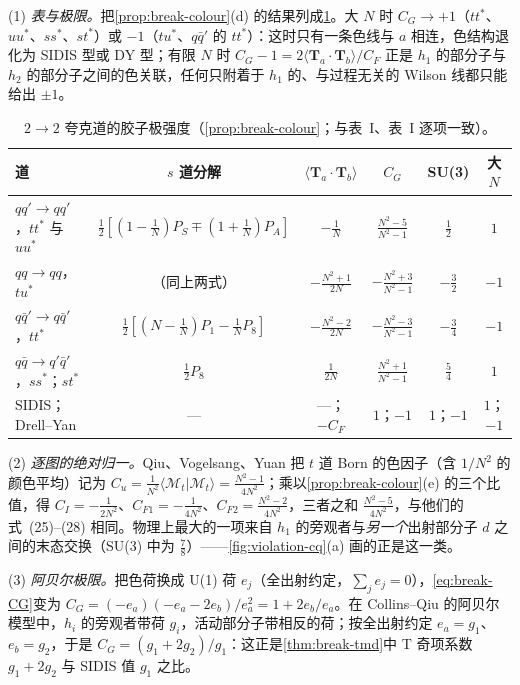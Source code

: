 \begin{example}\label{ex:break-colour}
(1) \emph{表与极限。}把\cref{prop:break-colour}(d) 的结果列成\cref{tab:break-CG}。大 $N$ 时 $C_G\to+1$（$tt^*$、$uu^*$、$ss^*$、$st^*$）或 $-1$（$tu^*$、$q\bar q'$ 的 $tt^*$）：这时只有一条色线与 $a$ 相连，色结构退化为 SIDIS 型或 DY 型；有限 $N$ 时 $C_G-1=2\langle\mathbf T_a\cdot\mathbf T_b\rangle/C_F$ 正是 $h_1$ 的部分子与 $h_2$ 的部分子之间的色关联，任何只附着于 $h_1$ 的、与过程无关的 Wilson 线都只能给出 $\pm1$。

\begin{table}[htbp]
\centering
\caption{$2\to2$ 夸克道的胶子极强度（\cref{prop:break-colour}；与\cite{BacchettaBomhofMuldersPijlman2005}表~I、\cite{QiuVogelsangYuan2007}表~I 逐项一致）。}
\label{tab:break-CG}
\small
\begin{tabular}{@{}lccccc@{}}
\toprule
道 & $s$ 道分解 & $\langle\mathbf T_a\cdot\mathbf T_b\rangle$ & $C_G$ & SU(3) & 大 $N$ \\
\midrule
$qq'\to qq'$，$tt^*$ 与 $uu^*$ & $\frac12[(1-\frac1N)P_S\mp(1+\frac1N)P_A]$ & $-\frac1N$ & $\frac{N^2-5}{N^2-1}$ & $\frac12$ & $1$ \\
$qq\to qq$，$tu^*$ & （同上两式） & $-\frac{N^2+1}{2N}$ & $-\frac{N^2+3}{N^2-1}$ & $-\frac32$ & $-1$ \\
$q\bar q'\to q\bar q'$，$tt^*$ & $\frac12[(N-\frac1N)P_1-\frac1NP_8]$ & $-\frac{N^2-2}{2N}$ & $-\frac{N^2-3}{N^2-1}$ & $-\frac34$ & $-1$ \\
$q\bar q\to q'\bar q'$，$ss^*$；$st^*$ & $\frac12P_8$ & $\frac1{2N}$ & $\frac{N^2+1}{N^2-1}$ & $\frac54$ & $1$ \\
\midrule
SIDIS；Drell--Yan & — & —；$-C_F$ & $1$；$-1$ & $1$；$-1$ & $1$；$-1$ \\
\bottomrule
\end{tabular}
\end{table}

(2) \emph{逐图的绝对归一。}Qiu、Vogelsang、Yuan 把 $t$ 道 Born 的色因子（含 $1/N^2$ 的颜色平均）记为 $C_u=\frac1{N^2}\langle\mathcal M_t|\mathcal M_t\rangle=\frac{N^2-1}{4N^2}$；乘以\cref{prop:break-colour}(e) 的三个比值，得 $C_I=-\frac{1}{2N^2}$、$C_{F1}=-\frac1{4N^2}$、$C_{F2}=\frac{N^2-2}{4N^2}$，三者之和 $\frac{N^2-5}{4N^2}$，与他们的式~(25)--(28) 相同。物理上最大的一项来自 $h_1$ 的旁观者与\emph{另一个}出射部分子 $d$ 之间的末态交换（SU(3) 中为 $\frac78$）——\cref{fig:violation-cq}(a) 画的正是这一类。

(3) \emph{阿贝尔极限。}把色荷换成 U(1) 荷 $e_j$（全出射约定，$\sum_je_j=0$），\cref{eq:break-CG}变为 $C_G=(-e_a)(-e_a-2e_b)/e_a^2=1+2e_b/e_a$。在 Collins--Qiu 的阿贝尔模型中，$h_i$ 的旁观者带荷 $g_i$，活动部分子带相反的荷；按全出射约定 $e_a=g_1$、$e_b=g_2$，于是 $C_G=(g_1+2g_2)/g_1$：这正是\cref{thm:break-tmd}中 T 奇项系数 $g_1+2g_2$ 与 SIDIS 值 $g_1$ 之比。


\end{example}
